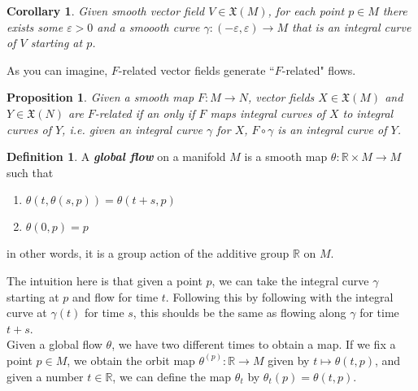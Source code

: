 \documentclass[psamsfonts]{amsart}
\newtheorem{cor}[thm]{Corollary}
\newtheorem{prop}[thm]{Proposition}
\theoremstyle{definition}
\newtheorem{defn}[thm]{Definition}
\theoremstyle{remark}
\newcommand{\R}{\mathbb{R}}
\newcommand{\ib}[1]{\textbf{\textit{#1}}}
\begin{document}
%
\begin{cor}
Given smooth vector field $V \in \mathfrak{X}(M)$, for each point $p \in M$ there
exists some $\varepsilon > 0$ and a smoooth curve
$\gamma : (-\varepsilon, \varepsilon) \to M$ that is an integral curve of $V$
starting at $p$.
\end{cor}
%
As you can imagine, $F$-related vector fields generate ``$F$-related" flows.
%
\begin{prop}
Given a smooth map $F: M \to N$, vector fields $X \in \mathfrak{X}(M)$ and
$Y \in \mathfrak{X}(N)$ are $F$-related if an only if $F$ maps integral
curves of $X$ to integral curves of $Y$, i.e. given an integral curve $\gamma$
for $X$, $F \circ \gamma$ is an integral curve of $Y$.
\end{prop}
%
\begin{defn}
A \ib{global flow} on a manifold $M$ is a smooth map $\theta : \R \times M \to M$
such that
\begin{enumerate}
  \item $\theta(t, \theta(s,p)) = \theta(t+s, p)$ \\
  \item $\theta(0,p) = p$
\end{enumerate}
in other words, it is a group action of the additive group $\R$ on $M$.
\end{defn}
%
The intuition here is that given a point $p$, we can take the integral curve $\gamma$
starting at $p$ and flow for time $t$. Following this by following with the integral curve
at $\gamma(t)$ for time $s$, this shoulds be the same as flowing along $\gamma$
for time $t+s$. \\

Given a global flow $\theta$, we have two different times to obtain a map. If we fix
a point $p\in M$, we obtain the orbit map $\theta^{(p)} : \R \to M$ given
by $t \mapsto \theta(t,p)$, and given a number $t \in \R$, we can
define the map $\theta_t$ by $\theta_t(p) = \theta(t,p)$.
%
\end{document}
